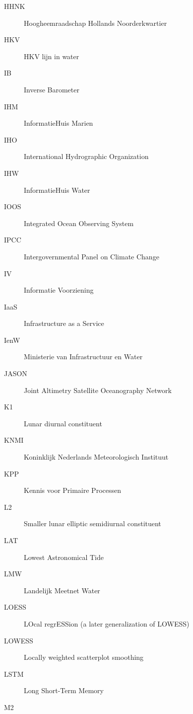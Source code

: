 \documentclass[ddraft]{deltares_report}
\begin{document}
\begin{description}
\item[\label{acronyms_HHNK}{HHNK}]
Hoogheemraadschap Hollands Noorderkwartier
\item[\label{acronyms_HKV}{HKV}]
HKV lijn in water
\item[\label{acronyms_IB}{IB}]
Inverse Barometer
\item[\label{acronyms_IHM}{IHM}]
InformatieHuis Marien
\item[\label{acronyms_IHO}{IHO}]
International Hydrographic Organization
\item[\label{acronyms_IHW}{IHW}]
InformatieHuis Water
\item[\label{acronyms_IOOS}{IOOS}]
Integrated Ocean Observing System
\item[\label{acronyms_IPCC}{IPCC}]
Intergovernmental Panel on Climate Change
\item[\label{acronyms_IV}{IV}]
Informatie Voorziening
\item[\label{acronyms_IaaS}{IaaS}]
Infrastructure as a Service
\item[\label{acronyms_IenW}{IenW}]
Ministerie van Infrastructuur en Water
\item[\label{acronyms_JASON}{JASON}]
Joint Altimetry Satellite Oceanography Network
\item[\label{acronyms_K1}{K1}]
Lunar diurnal constituent
\item[\label{acronyms_KNMI}{KNMI}]
Koninklijk Nederlands Meteorologisch Instituut
\item[\label{acronyms_KPP}{KPP}]
Kennis voor Primaire Processen
\item[\label{acronyms_L2}{L2}]
Smaller lunar elliptic semidiurnal constituent
\item[\label{acronyms_LAT}{LAT}]
Lowest Astronomical Tide
\item[\label{acronyms_LMW}{LMW}]
Landelijk Meetnet Water
\item[\label{acronyms_LOESS}{LOESS}]
LOcal regrESSion (a later generalization of LOWESS)
\item[\label{acronyms_LOWESS}{LOWESS}]
Locally weighted scatterplot smoothing
\item[\label{acronyms_LSTM}{LSTM}]
Long Short-Term Memory
\item[\label{acronyms_M2}{M2}]

\end{description}
\end{document}
